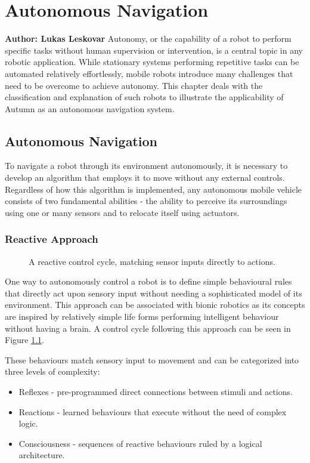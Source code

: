 \chapter{Autonomous Navigation}

\textbf{Author: Lukas Leskovar} 
Autonomy, or the capability of a robot to perform specific tasks without human supervision or intervention, is a central topic in any robotic application.
While stationary systems performing repetitive tasks can be automated relatively effortlessly, mobile robots introduce many challenges that need to be overcome to achieve autonomy.
This chapter deals with the classification and explanation of such robots to illustrate the applicability of Autumn as an autonomous navigation system.

\section{Autonomous Navigation}
To navigate a robot through its environment autonomously, it is necessary to develop an algorithm that employs it to move without any external controls. Regardless of how this algorithm is implemented, any autonomous mobile vehicle consists of two fundamental abilities - the ability to perceive its surroundings using one or many sensors and to relocate itself using actuators. 

\subsection{Reactive Approach}

\begin{figure}
	\centering
	
	\caption{
		A reactive control cycle, matching sensor inputs directly to actions.
	}
	\label{fig:reactiveApproach}
\end{figure}

One way to autonomously control a robot is to define simple behavioural rules that directly act upon sensory input without needing a sophisticated model of its environment. 
This approach can be associated with bionic robotics as its concepts are inspired by relatively simple life forms performing intelligent behaviour without having a brain. 
A control cycle following this approach can be seen in Figure \ref{fig:reactiveApproach}.

These behaviours match sensory input to movement and can be categorized into three levels of complexity:
\begin{itemize}
	\item Reflexes - pre-programmed direct connections between stimuli and actions.
	\item Reactions - learned behaviours that execute without the need of complex logic.
	\item Consciousness - sequences of reactive behaviours ruled by a logical architecture.
\end{itemize}

